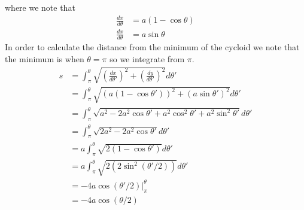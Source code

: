 \documentclass[11pt]{article}
\numberwithin{equation}{section}
\begin{document}
\begin{enumerate}[(a)]
where we note that
\begin{align*}
\frac{dx}{d\theta} &= a(1-\cos\theta)\\
\frac{dx}{d\theta} &= a\sin\theta
\end{align*}
In order to calculate the distance from the minimum of the cycloid we note that the minimum
is when $\theta = \pi$ so we integrate from $\pi$.
\begin{align*}
s &= \int_{\pi}^{\theta}\sqrt{\left(\frac{dx}{d\theta'}\right)^2 + \left(\frac{dy}{d\theta'}\right)^2}d\theta'\\
&= \int_{\pi}^{\theta}\sqrt{\left(a(1-\cos\theta')\right)^2 + \left(a\sin\theta'\right)^2}d\theta'\\
&= \int_{\pi}^{\theta}\sqrt{a^2-2a^2\cos\theta'+a^2\cos^2\theta'+a^2\sin^2\theta'}d\theta'\\
&= \int_{\pi}^{\theta}\sqrt{2a^2-2a^2\cos\theta'}d\theta'\\
&= a\int_{\pi}^{\theta}\sqrt{2(1-\cos\theta')}d\theta'\\
&= a\int_{\pi}^{\theta}\sqrt{2(2\sin^2(\theta'/2))}d\theta'\\
&= -4a\left.\cos(\theta'/2)\right|_{\pi}^{\theta}\\
&= -4a\cos(\theta/2)
\end{align*}


\end{enumerate}
\end{document}
